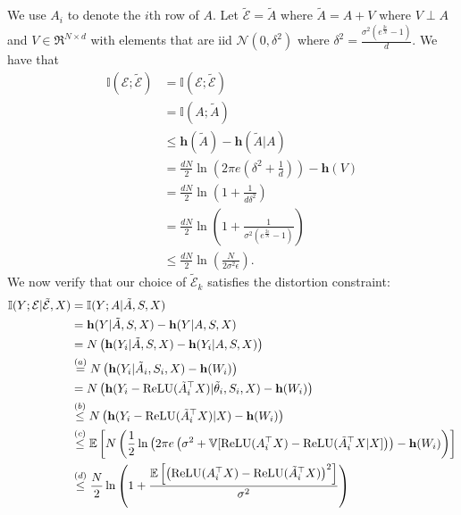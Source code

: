 \documentclass[twoside,11pt]{article}
\renewenvironment{proof}{\par\noindent{\bf Proof\ }}{\hfill\BlackBox\\[2mm]}
\newenvironment{proof}{\par\noindent{\bf Proof\ }}{\hfill\BlackBox\\[2mm]}
\def\environment{\mathcal{E}}
\def\proxy{\tilde{\environment}}
\def\diffentropy{\bf h}
\def\var{\mathbb{V}}
\def\proxytheta{\tilde{\theta}}
\def\relu{{\rm ReLU}}
\def\E{\mathbb{E}}
\def\diffentropy{\mathbf{h}}
\def\I{\mathbb{I}}
\begin{document}
\pLayerReLUNN*
\begin{proof}
    We use $A_i$ to denote the $i$th row of $A$. Let $\proxy = \tilde{A}$ where $\tilde{A} = A + V$ where $V \perp A$ and $V\in\Re^{N\times d}$ with elements that are iid $\mathcal{N}(0, \delta^2)$ where $\delta^2 = \frac{\sigma^2\left(e^{\frac{2\epsilon}{N}}-1\right)}{d}$. We have that
    \begin{align*}
        \I(\environment;\proxy)
        & = \I(\environment;\proxy)\\
        & = \I(A;\tilde{A})\\
        & \leq \diffentropy(\tilde{A}) - \diffentropy(\tilde{A}|A)\\
        & = \frac{dN}{2}\ln\left(2\pi e\left(\delta^2 + \frac{1}{d}\right)\right) - \diffentropy(V)\\
        & = \frac{dN}{2}\ln\left(1 + \frac{1}{d\delta^2}\right)\\
        & = \frac{dN}{2}\ln\left(1 +\frac{1}{\sigma^2\left(e^{\frac{2\epsilon}{N}}-1\right)} \right)\\
        & \leq \frac{dN}{2}\ln\left(\frac{N}{2\sigma^2\epsilon}\right).
    \end{align*}
    We now verify that our choice of $\proxy_k$ satisfies the distortion constraint:
    \begin{align*}
        \I(Y;\environment|\proxy, X)
        & = \I(Y;A|\tilde{A}, S, X)\\
        & = \diffentropy(Y|\tilde{A}, S, X) - \diffentropy(Y|A, S, X)\\
        & = N\left(\diffentropy(Y_i|\tilde{A}, S, X) - \diffentropy(Y_i|A, S, X)\right)\\
        & \overset{(a)}{=} N\left(\diffentropy(Y_i|\tilde{A}_i, S_i, X) - \diffentropy(W_i)\right)\\
        & = N\left(\diffentropy(Y_i - \relu(\tilde{A}_i^\top X)|\proxytheta_i, S_i, X) - \diffentropy(W_i)\right)\\
        & \overset{(b)}{\leq} N\left(\diffentropy(Y_i - \relu(\tilde{A}_i^\top X )|X) - \diffentropy(W_i)\right)\\
        & \overset{(c)}{\leq} \E\left[N\left(\frac{1}{2}\ln\left(2\pi e \left(\sigma^2 + \var[\relu(A_i^\top X) - \relu(\tilde{A}_i^\top X|X]\right)\right) - \diffentropy(W_i)\right)\right]\\
        & \overset{(d)}{\leq} \frac{N}{2}\ln\left(1 + \frac{\E\left[\left(\relu(A_i^\top X) - \relu(\tilde{A}_i^\top X)\right)^2\right]}{\sigma^2}\right)\\

\end{align*}
\end{proof}
\end{document}
